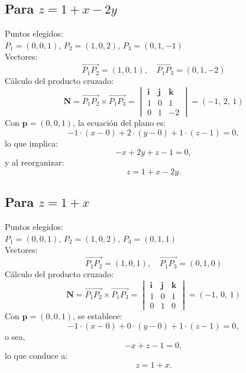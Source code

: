 \documentclass{article}
\begin{document}
\subsection{Para $z = 1 + x - 2y$}
Puntos elegidos: \\ 
$P_1 = (0,0,1)$, $P_2 = (1,0,2)$, $P_3 = (0,1,-1)$ \\[1mm]
Vectores:
\begin{equation*}
    \overrightarrow{P_1P_2} = (1,0,1), \quad \overrightarrow{P_1P_3} = (0,1,-2)
\end{equation*}
Cálculo del producto cruzado:
\begin{equation*}
    \mathbf{N} = \overrightarrow{P_1P_2} \times \overrightarrow{P_1P_3} =
    \begin{vmatrix} 
    \mathbf{i} & \mathbf{j} & \mathbf{k} \\
    1 & 0 & 1 \\
    0 & 1 & -2
    \end{vmatrix} = (-1,\,2,\,1)
\end{equation*}
Con \( \mathbf{p} = (0,0,1) \), la ecuación del plano es:
\[
-1\cdot (x-0) + 2\cdot (y-0) + 1\cdot (z-1) = 0,
\]
lo que implica:
\[
-x + 2y + z - 1 = 0,
\]
y al reorganizar:
\[
z = 1 + x - 2y.
\]

\subsection{Para $z = 1 + x$}
Puntos elegidos: \\ 
$P_1 = (0,0,1)$, $P_2 = (1,0,2)$, $P_3 = (0,1,1)$ \\[1mm]
Vectores:
\begin{equation*}
    \overrightarrow{P_1P_2} = (1,0,1), \quad \overrightarrow{P_1P_3} = (0,1,0)
\end{equation*}
Cálculo del producto cruzado:
\begin{equation*}
    \mathbf{N} = \overrightarrow{P_1P_2} \times \overrightarrow{P_1P_3} =
    \begin{vmatrix} 
    \mathbf{i} & \mathbf{j} & \mathbf{k} \\
    1 & 0 & 1 \\
    0 & 1 & 0
    \end{vmatrix} = (-1,\,0,\,1)
\end{equation*}
Con \( \mathbf{p} = (0,0,1) \), se establece:
\[
-1\cdot (x-0) + 0\cdot (y-0) + 1\cdot (z-1) = 0,
\]
o sea,
\[
-x + z - 1 = 0,
\]
lo que conduce a:
\[
z = 1 + x.
\]
\end{document}

